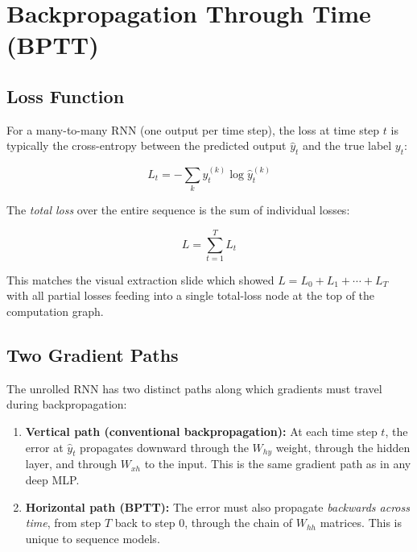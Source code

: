 \documentclass[12pt,a4paper]{article}
\newcommand{\Whh}{W_{hh}}
\newcommand{\Wxh}{W_{xh}}
\newcommand{\Why}{W_{hy}}
\begin{document}
\section{Backpropagation Through Time (BPTT)}
\label{sec:bptt}

\subsection{Loss Function}
\label{subsec:loss}

For a many-to-many RNN (one output per time step), the loss at time step $t$ is
typically the cross-entropy between the predicted output $\hat{y}_t$ and the
true label $y_t$:

\begin{equation}
  L_t = -\sum_{k} y_t^{(k)} \log \hat{y}_t^{(k)}
  \label{eq:local_loss}
\end{equation}

The \emph{total loss} over the entire sequence is the sum of individual losses:

\begin{equation}
  L = \sum_{t=1}^{T} L_t
  \label{eq:total_loss}
\end{equation}

This matches the visual extraction slide which showed $L = L_0 + L_1 + \cdots
+ L_T$ with all partial losses feeding into a single total-loss node at the
top of the computation graph.

\subsection{Two Gradient Paths}
\label{subsec:two_paths}

The unrolled RNN has two distinct paths along which gradients must travel
during backpropagation:

\begin{enumerate}[label=\arabic*.]
  \item \textbf{Vertical path (conventional backpropagation):} At each time
        step $t$, the error at $\hat{y}_t$ propagates downward through the
        $\Why$ weight, through the hidden layer, and through $\Wxh$ to the
        input.  This is the same gradient path as in any deep MLP.
  \item \textbf{Horizontal path (BPTT):} The error must also propagate
        \emph{backwards across time}, from step $T$ back to step $0$, through
        the chain of $\Whh$ matrices.  This is unique to sequence models.
\end{enumerate}
\end{document}
